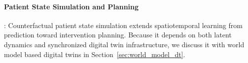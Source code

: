 \documentclass[journal]{IEEEtran}
\begin{document}


\paragraph{Patient State Simulation and Planning}: Counterfactual patient state simulation extends spatiotemporal learning from prediction toward intervention planning. Because it depends on both latent dynamics and synchronized digital twin infrastructure, we discuss it with world model based digital twins in Section~\ref{sec:world_model_dt}.
\end{document}

